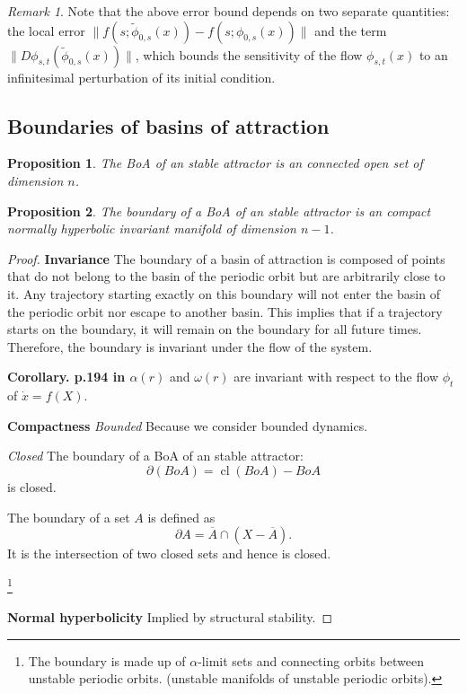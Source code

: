 \documentclass{article}
\newtheorem{proposition}{Proposition}
\theoremstyle{definition}
\theoremstyle{remark}
\newtheorem{remark}{Remark}
\newcommand{\cl}{\operatorname{cl}}
\newcounter{ct}
\begin{document}
\begin{remark}\label{rem:313}
Note that the above error bound depends on two separate quantities: 
the local error \( \| f(s; \tilde{\phi}_{0,s}(x)) - f(s; \phi_{0,s}(x)) \| \) 
and 
the term \( \| D\phi_{s,t}(\tilde{\phi}_{0,s}(x)) \| \), which bounds the sensitivity of the flow \( \phi_{s,t}(x) \) to an infinitesimal perturbation of its initial condition.
\end{remark}



\subsection{Boundaries of basins of attraction}\label{sec:boaboundary}

\begin{proposition}
The BoA of an stable attractor is an connected open set of dimension $n$. %
\end{proposition}


\begin{proposition}
The boundary of a BoA of an stable attractor is an compact normally hyperbolic invariant manifold of dimension $n-1$. %
\end{proposition}

\begin{proof}
\textbf{Invariance}
The boundary of a basin of attraction is composed of points that do not belong to the basin of the periodic orbit but are arbitrarily close to it.
 Any trajectory starting exactly on this boundary will not enter the basin of the periodic orbit nor escape to another basin.
This implies that if a trajectory starts on the boundary, it will remain on the boundary for all future times. Therefore, the boundary is invariant under the flow of the system.


\textbf{Corollary. p.194 in \citep{perko2013differential}} \( \alpha(r) \) and \( \omega(r) \) are invariant with respect to the flow \( \phi_t \) of \(\dot x = f(X)\). %

\textbf{Compactness}
\textit{Bounded} Because we consider bounded dynamics.

\textit{Closed} 
The boundary of a BoA of an stable attractor:
\[\partial(BoA) = \cl(BoA) -  BoA\]
is closed.

The boundary of a set \( A \) is defined as 
\[
\partial A = \overline{A} \cap (X - \overline{A}).
\]
It is the intersection of two closed sets and hence is closed.


\footnote{
The boundary is made up of 
$\alpha$-limit sets 
and
connecting orbits between unstable periodic orbits.
(unstable manifolds of unstable periodic orbits).
}


\textbf{Normal hyperbolicity}
Implied by structural stability.

\end{proof}
\end{document}
